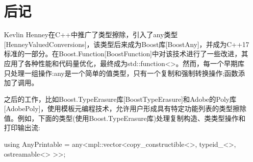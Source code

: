 \section{后记}
Kevlin Henney在C++中推广了类型擦除，引入了any类型[HenneyValuedConversions]，该类型后来成为Boost库[BoostAny]，并成为C++17标准的一部分。在Boost.Function[BoostFunction]中对该技术进行了一些改进，其应用了各种性能和代码量优化，最终成为std::function<>。然而，每一个早期库只处理一组操作:any是一个简单的值类型，只有一个复制和强制转换操作;函数添加了调用。

之后的工作，比如Boost.TypeErasure库[BoostTypeErasure]和Adobe的Poly库[AdobePoly]，使用模板元编程技术，允许用户形成具有特定功能列表的类型擦除值。例如，下面的类型(使用Boost.TypeErasure库)处理复制构造、类类型操作和打印输出流:

\begin{cpp}
using AnyPrintable = any<mpl::vector<copy_constructible<>,
									typeid_<>,
									ostreamable<>
									>>;
\end{cpp}